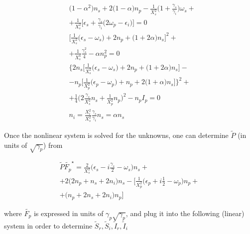 \documentclass[a4paper,prb,10pt,aps,twocolumn]{revtex4-1}
\begin{document}
\begin{subequations}
\begin{align}
&\Bigg(1-\alpha^{2}\Bigg)n_{s}+2\Bigg(1-\alpha\Bigg)n_{p}-\frac{1}{X_{s}^{2}}\Bigg(1+\frac{\gamma_{s}}{\gamma_{i}}\Bigg)\omega_{s}+\nonumber \\ 
&+\frac{1}{X_{s}^{2}}\Bigg[\epsilon_{s}+\frac{\gamma_{s}}{\gamma_{i}}\Bigg(2\omega_{p}-\epsilon_{i}\Bigg)\Bigg]=0 \\
&\Bigg[\frac{1}{X_{s}^{2}}\Bigg(\epsilon_{s}-\omega_{s}\Bigg)+2n_{p}+\Bigg(1+2\alpha\Bigg)n_{s}\Bigg]^{2}+\nonumber \\ &+\frac{1}{X_{s}^{4}}\frac{\gamma_{s}^{2}}{4}-\alpha n_{p}^{2}=0 \\
&\Bigg\{ 2n_{s}\Bigg[\frac{1}{X_{s}^{2}}\Bigg(\epsilon_{s}-\omega_{s}\Bigg)+2n_{p}+\Bigg(1+2\alpha\Bigg)n_{s}\Bigg]-\nonumber \\ 
&-n_{p}\Bigg[\frac{1}{X_{p}^{2}}\Bigg(\epsilon_{p}-\omega_{p}\Bigg)+n_{p}+2\Bigg(1+\alpha\Bigg)n_{s}\Bigg]\Bigg\} ^{2}+\nonumber \\ 
&+\frac{1}{4}\Bigg(2\frac{\gamma_{s}}{X_{s}^{2}}n_{s}+\frac{1}{X_{p}^{2}}n_{p}\Bigg)^{2}-n_{p}I_{p}=0 \\
&n_{i}=\frac{X_{i}^{2}}{X_{s}^{2}}\frac{\gamma_{s}}{\gamma_{i}}n_{s}=\alpha n_{s}
\end{align}
\end{subequations}


Once the nonlinear system is solved for the unknowns, one can determine
$\tilde{P}$ (in units of $\sqrt{\gamma_p}$) from

\begin{multline}
  \label{eq:12}
\tilde{P}\tilde{F_{p}}^{\star}=\frac{2}{X_{s}^{2}}\Bigg(\epsilon_{s}-i\frac{\gamma_{s}}{2}-\omega_{s}\Bigg)n_{s}+\\+
2\Bigg(2n_{p}+n_{s}+2n_{i}\Bigg)n_{s}-\Bigg[\frac{1}{X_{p}^{2}}\Bigg(\epsilon_{p}+i\frac{1}{2}-\omega_{p}\Bigg)n_{p}+\\+
\Bigg(n_{p}+2n_{s}+2n_{i}\Bigg)n_{p}\Bigg]  
\end{multline}


where $\tilde{F_p}$ is expressed in units of
$\gamma_p \sqrt{\gamma_p}$, and plug it into the following
(linear) system in order to determine
$\tilde{S}_{r}, \tilde{S}_{i}, \tilde{I}_{r}, \tilde{I}_{i}$
\end{document}

